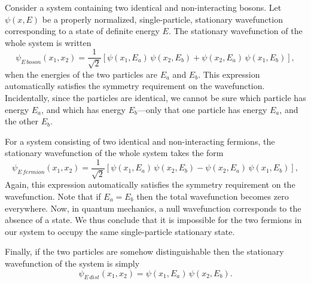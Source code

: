 Consider a system containing two identical and non-interacting bosons.
Let $\psi(x,E)$ be a properly normalized, single-particle, stationary wavefunction corresponding to a state of definite energy $E$.
The stationary wavefunction of the
whole system is written
\begin{equation}
\psi_{E\,boson}(x_1,x_2) = \frac{1}{\sqrt{2}}\left[\psi(x_1,E_a)\,\psi(x_2,E_b)+\psi(x_2,E_a)\,\psi(x_1,E_b)\right],
\end{equation}
when the energies of the two particles are $E_a$ and $E_b$. This
expression automatically satisfies the symmetry requirement on the
wavefunction. Incidentally, since the particles are
identical, we cannot be sure which particle
has energy $E_a$, and which has energy $E_b$---only that one particle
has energy $E_a$, and the other $E_b$.

For a system consisting of two identical and non-interacting fermions,
the stationary wavefunction of the whole system takes
the form
\begin{equation}
\psi_{E\,fermion}(x_1,x_2) = \frac{1}{\sqrt{2}}\left[\psi(x_1,E_a)\,\psi(x_2,E_b)-\psi(x_2,E_a)\,\psi(x_1,E_b)\right],
\end{equation}
Again, this expression automatically satisfies the symmetry requirement on
the wavefunction. Note that if $E_a=E_b$ then the total wavefunction
becomes zero everywhere. Now, in quantum mechanics, a null wavefunction
corresponds to the absence of a state. We thus conclude that it
is impossible for the two fermions in our system to occupy the
same single-particle stationary state. 

Finally, if the two particles are somehow distinguishable then the stationary
wavefunction of the system is simply
\begin{equation}
\psi_{E\,dist}(x_1,x_2) = \psi(x_1,E_a)\,\psi(x_2,E_b).
\end{equation}

